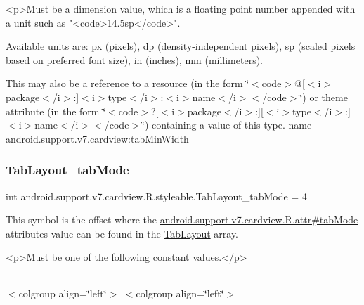 \begin{DoxyVerb}      <p>Must be a dimension value, which is a floating point number appended with a unit such as "<code>14.5sp</code>".
\end{DoxyVerb}
 Available units are\+: px (pixels), dp (density-\/independent pixels), sp (scaled pixels based on preferred font size), in (inches), mm (millimeters). 

This may also be a reference to a resource (in the form \char`\"{}$<$code$>$@\mbox{[}$<$i$>$package$<$/i$>$\+:\mbox{]}$<$i$>$type$<$/i$>$\+:$<$i$>$name$<$/i$>$$<$/code$>$\char`\"{}) or theme attribute (in the form \char`\"{}$<$code$>$?\mbox{[}$<$i$>$package$<$/i$>$\+:\mbox{]}\mbox{[}$<$i$>$type$<$/i$>$\+:\mbox{]}$<$i$>$name$<$/i$>$$<$/code$>$\char`\"{}) containing a value of this type.  name android.\+support.\+v7.\+cardview\+:tab\+Min\+Width \mbox{\label{classandroid_1_1support_1_1v7_1_1cardview_1_1R_1_1styleable_aa12cc853d9a48dbe68c02155169f3221}} 
\subsubsection{\texorpdfstring{Tab\+Layout\+\_\+tab\+Mode}{TabLayout\_tabMode}}
{\footnotesize\ttfamily int android.\+support.\+v7.\+cardview.\+R.\+styleable.\+Tab\+Layout\+\_\+tab\+Mode = 4\hspace{0.3cm}{\ttfamily [static]}}

This symbol is the offset where the \hyperlink{classandroid_1_1support_1_1v7_1_1cardview_1_1R_1_1attr_a3c24a77c1c5e85a581ff4d14de5f5b4c}{android.\+support.\+v7.\+cardview.\+R.\+attr\#tab\+Mode} attribute\textquotesingle{}s value can be found in the \hyperlink{classandroid_1_1support_1_1v7_1_1cardview_1_1R_1_1styleable_afa0dc9366603eaec9e38d99273ba8512}{Tab\+Layout} array.

\begin{DoxyVerb}      <p>Must be one of the following constant values.</p>
\end{DoxyVerb}
 \tabulinesep=1mm
\begin{longtabu} spread 0pt [c]{*{0}{|X[-1]}|}
\hline
\end{longtabu}
$<$colgroup align=\char`\"{}left\char`\"{}$>$ $<$colgroup align=\char`\"{}left\char`\"{}$>$ 

